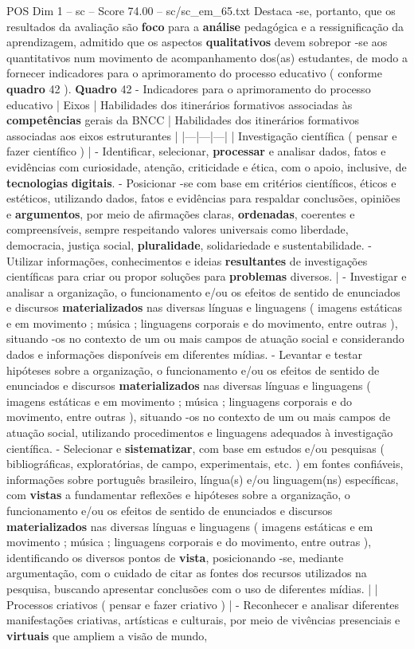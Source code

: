 \begin{textsample}{POS Dim 1 – sc – Score 74.00 – sc/sc\_em\_65.txt}
Destaca -se, portanto, que os resultados da avaliação são \textbf{foco} para a \textbf{análise} pedagógica e a ressignificação da aprendizagem, admitido que os aspectos \textbf{qualitativos} devem sobrepor -se aos quantitativos num movimento de acompanhamento dos(as) estudantes, de modo a fornecer indicadores para o aprimoramento do processo educativo ( conforme \textbf{quadro} 42 ). \textbf{Quadro} 42 - Indicadores para o aprimoramento do processo educativo | Eixos | Habilidades dos itinerários formativos associadas às \textbf{competências} gerais da BNCC | Habilidades dos itinerários formativos associadas aos eixos estruturantes | |---|---|---| | Investigação científica ( pensar e fazer científico ) | - Identificar, selecionar, \textbf{processar} e analisar dados, fatos e evidências com curiosidade, atenção, criticidade e ética, com o apoio, inclusive, de \textbf{tecnologias} \textbf{digitais}. - Posicionar -se com base em critérios científicos, éticos e estéticos, utilizando dados, fatos e evidências para respaldar conclusões, opiniões e \textbf{argumentos}, por meio de afirmações claras, \textbf{ordenadas}, coerentes e compreensíveis, sempre respeitando valores universais como liberdade, democracia, justiça social, \textbf{pluralidade}, solidariedade e sustentabilidade. - Utilizar informações, conhecimentos e ideias \textbf{resultantes} de investigações científicas para criar ou propor soluções para \textbf{problemas} diversos. | - Investigar e analisar a organização, o funcionamento e/ou os efeitos de sentido de enunciados e discursos \textbf{materializados} nas diversas línguas e linguagens ( imagens estáticas e em movimento ; música ; linguagens corporais e do movimento, entre outras ), situando -os no contexto de um ou mais campos de atuação social e considerando dados e informações disponíveis em diferentes mídias. - Levantar e testar hipóteses sobre a organização, o funcionamento e/ou os efeitos de sentido de enunciados e discursos \textbf{materializados} nas diversas línguas e linguagens ( imagens estáticas e em movimento ; música ; linguagens corporais e do movimento, entre outras ), situando -os no contexto de um ou mais campos de atuação social, utilizando procedimentos e linguagens adequados à investigação científica. - Selecionar e \textbf{sistematizar}, com base em estudos e/ou pesquisas ( bibliográficas, exploratórias, de campo, experimentais, etc. ) em fontes confiáveis, informações sobre português brasileiro, língua(s) e/ou linguagem(ns) específicas, com \textbf{vistas} a fundamentar reflexões e hipóteses sobre a organização, o funcionamento e/ou os efeitos de sentido de enunciados e discursos \textbf{materializados} nas diversas línguas e linguagens ( imagens estáticas e em movimento ; música ; linguagens corporais e do movimento, entre outras ), identificando os diversos pontos de \textbf{vista}, posicionando -se, mediante argumentação, com o cuidado de citar as fontes dos recursos utilizados na pesquisa, buscando apresentar conclusões com o uso de diferentes mídias. | | Processos criativos ( pensar e fazer criativo ) | - Reconhecer e analisar diferentes manifestações criativas, artísticas e culturais, por meio de vivências presenciais e \textbf{virtuais} que ampliem a visão de mundo, 
\end{textsample}
